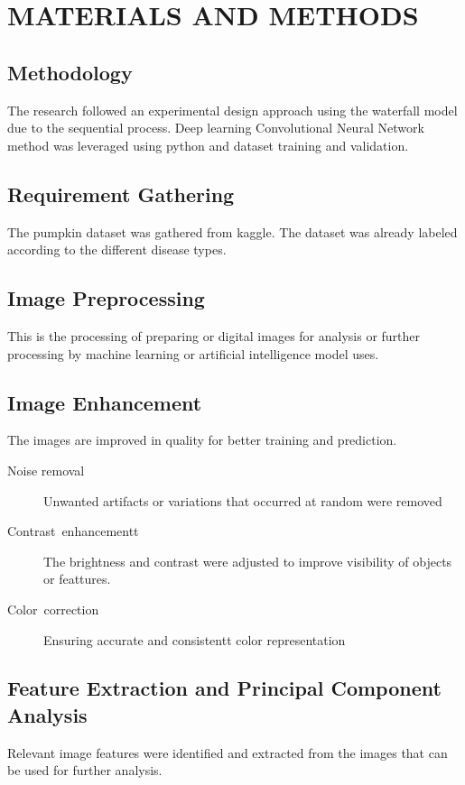 \chapter{\nameTitleSpace MATERIALS AND METHODS}
\chpterTitleSection
\section{Methodology} \sectionTitleBody
The research followed an experimental design approach using
the waterfall model due to the sequential process. Deep learning Convolutional
Neural Network method was leveraged using python and dataset training
and validation.

\section{Requirement Gathering}\sectionTitleBody
The pumpkin dataset was gathered from kaggle. The dataset
was already labeled according to the different disease types.

\section{Image Preprocessing} \sectionTitleBody This is the processing of preparing or digital images for analysis or further processing by machine learning or artificial intelligence model uses.

\section{Image Enhancement}\sectionTitleBody The images are improved in quality for better training and prediction.
	\begin{description}
	\item[Noise removal] Unwanted artifacts or variations that occurred at random were removed
	
	\item[Contrast~enhancementt] The brightness and contrast were adjusted to improve visibility of objects or feattures.
	\item[Color~correction] Ensuring accurate and consistentt color representation
\end{description}
\section{Feature Extraction and Principal Component Analysis}\sectionTitleBody
Relevant image features were identified and extracted from  the images that can be used for further analysis.

